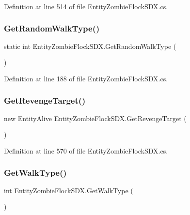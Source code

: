Definition at line 514 of file Entity\+Zombie\+Flock\+S\+D\+X.\+cs.

\mbox{\label{class_entity_zombie_flock_s_d_x_a7c3b7ed327760162b331626c48799388}} 
\subsubsection{\texorpdfstring{GetRandomWalkType()}{GetRandomWalkType()}}
{\footnotesize\ttfamily static int Entity\+Zombie\+Flock\+S\+D\+X.\+Get\+Random\+Walk\+Type (\begin{DoxyParamCaption}{ }\end{DoxyParamCaption})\hspace{0.3cm}{\ttfamily [static]}}



Definition at line 188 of file Entity\+Zombie\+Flock\+S\+D\+X.\+cs.

\mbox{\label{class_entity_zombie_flock_s_d_x_aec7a0267dc85291cd1ccf4827fce82b3}} 
\subsubsection{\texorpdfstring{GetRevengeTarget()}{GetRevengeTarget()}}
{\footnotesize\ttfamily new Entity\+Alive Entity\+Zombie\+Flock\+S\+D\+X.\+Get\+Revenge\+Target (\begin{DoxyParamCaption}{ }\end{DoxyParamCaption})}



Definition at line 570 of file Entity\+Zombie\+Flock\+S\+D\+X.\+cs.

\mbox{\label{class_entity_zombie_flock_s_d_x_a44fdfec0a852e053f1b21d06e36a013d}} 
\subsubsection{\texorpdfstring{GetWalkType()}{GetWalkType()}}
{\footnotesize\ttfamily int Entity\+Zombie\+Flock\+S\+D\+X.\+Get\+Walk\+Type (\begin{DoxyParamCaption}{ }\end{DoxyParamCaption})}



